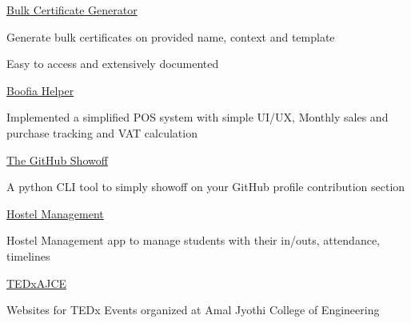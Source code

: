 \begin{cventries}
    \cventry
    {} %
    {\hyperlink{https://github.com/zameel7/bulk-certificate.git}{Bulk Certificate Generator}} %
    {} %
    {} %
    {
      \begin{cvitems} %
      	\item {Generate bulk certificates on provided name, context and template}
        \item {Easy to access and extensively documented}
      \end{cvitems}
    }

    \cventry
    {} %
    {\hyperlink{boofiahelper.zameel7.repl.co}{Boofia Helper}} %
    {} %
    {} %
    {
      \begin{cvitems} %
      	\item {Implemented a simplified POS system with simple UI/UX, Monthly sales and purchase tracking and VAT calculation}
      \end{cvitems}
    }

    \cventry
    {} %
    {\hyperlink{https://github.com/rabeeh-ta/the-github-showoff.git}{The GitHub Showoff}} %
    {} %
    {} %
    {
      \begin{cvitems} %
      	\item {A python CLI tool to simply showoff on your GitHub profile contribution section}
      \end{cvitems}
    }

    \cventry
    {} %
    {\hyperlink{https://hostel-app-frontend.vercel.app/authentication/sign-in}{Hostel Management}} %
    {} %
    {} %
    {
      \begin{cvitems} %
      	\item {Hostel Management app to manage students with their in/outs, attendance, timelines}
      \end{cvitems}
    }

    \cventry
    {} %
    {\hyperlink{https://www.tedxajce.in}{TEDxAJCE}} %
    {} %
    {} %
    {
      \begin{cvitems} %
      	\item {Websites for TEDx Events organized at Amal Jyothi College of Engineering}
      \end{cvitems}
    }
\end{cventries}